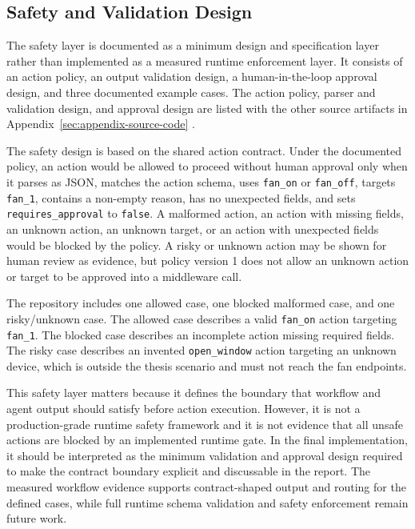 \subsection{Safety and Validation Design}\label{subsec:implementation-safety}

The safety layer is documented as a minimum design and specification layer rather than implemented as a measured runtime enforcement layer. It consists of an action policy, an output validation design, a human-in-the-loop approval design, and three documented example cases. The action policy, parser and validation design, and approval design are listed with the other source artifacts in Appendix~\ref{sec:appendix-source-code} \cite{humanInTheLoopAmershi2014}.

The safety design is based on the shared action contract. Under the documented policy, an action would be allowed to proceed without human approval only when it parses as JSON, matches the action schema, uses \texttt{fan\_on} or \texttt{fan\_off}, targets \texttt{fan\_1}, contains a non-empty reason, has no unexpected fields, and sets \texttt{requires\_approval} to \texttt{false}. A malformed action, an action with missing fields, an unknown action, an unknown target, or an action with unexpected fields would be blocked by the policy. A risky or unknown action may be shown for human review as evidence, but policy version 1 does not allow an unknown action or target to be approved into a middleware call.

The repository includes one allowed case, one blocked malformed case, and one risky/unknown case. The allowed case describes a valid \texttt{fan\_on} action targeting \texttt{fan\_1}. The blocked case describes an incomplete action missing required fields. The risky case describes an invented \texttt{open\_window} action targeting an unknown device, which is outside the thesis scenario and must not reach the fan endpoints.

This safety layer matters because it defines the boundary that workflow and agent output should satisfy before action execution. However, it is not a production-grade runtime safety framework and it is not evidence that all unsafe actions are blocked by an implemented runtime gate. In the final implementation, it should be interpreted as the minimum validation and approval design required to make the contract boundary explicit and discussable in the report. The measured workflow evidence supports contract-shaped output and routing for the defined cases, while full runtime schema validation and safety enforcement remain future work.

